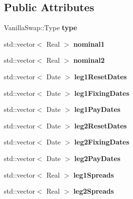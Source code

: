 \subsection*{Public Attributes}
\begin{DoxyCompactItemize}
\item 
Vanilla\+Swap\+::\+Type {\bfseries type}\label{class_quant_lib_1_1_float_float_swap_1_1arguments_a344fc20bdd82d7531d9a909574955959}

\item 
std\+::vector$<$ Real $>$ {\bfseries nominal1}\label{class_quant_lib_1_1_float_float_swap_1_1arguments_aa2fb0d307dc0cc2778d9e780b95f3da8}

\item 
std\+::vector$<$ Real $>$ {\bfseries nominal2}\label{class_quant_lib_1_1_float_float_swap_1_1arguments_a85bf1b069e21987ffe74c6b2721bf5c6}

\item 
std\+::vector$<$ Date $>$ {\bfseries leg1\+Reset\+Dates}\label{class_quant_lib_1_1_float_float_swap_1_1arguments_a57f9b1d54db61fb6d5e241bdcc5e6a36}

\item 
std\+::vector$<$ Date $>$ {\bfseries leg1\+Fixing\+Dates}\label{class_quant_lib_1_1_float_float_swap_1_1arguments_a8295d0d7beb5862a813942025c04fc9f}

\item 
std\+::vector$<$ Date $>$ {\bfseries leg1\+Pay\+Dates}\label{class_quant_lib_1_1_float_float_swap_1_1arguments_aed64b971dd70d67f302193b53658abc8}

\item 
std\+::vector$<$ Date $>$ {\bfseries leg2\+Reset\+Dates}\label{class_quant_lib_1_1_float_float_swap_1_1arguments_aa5dd27ff037ebedaa68b1343106e3a18}

\item 
std\+::vector$<$ Date $>$ {\bfseries leg2\+Fixing\+Dates}\label{class_quant_lib_1_1_float_float_swap_1_1arguments_abb89ef4e77a265b523c54ae33c5a1774}

\item 
std\+::vector$<$ Date $>$ {\bfseries leg2\+Pay\+Dates}\label{class_quant_lib_1_1_float_float_swap_1_1arguments_a49fe4802ee711052222ef919cd4a9384}

\item 
std\+::vector$<$ Real $>$ {\bfseries leg1\+Spreads}\label{class_quant_lib_1_1_float_float_swap_1_1arguments_aebecc523b30b63aceb1a70b1f350820d}

\item 
std\+::vector$<$ Real $>$ {\bfseries leg2\+Spreads}\label{class_quant_lib_1_1_float_float_swap_1_1arguments_a1a7aa4faf8bc8c1c9dd854e499745853}


\end{DoxyCompactItemize}
